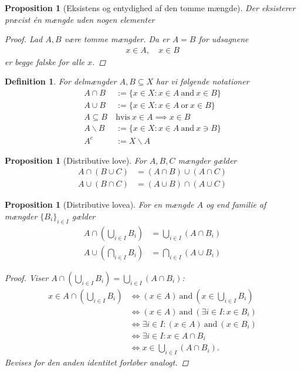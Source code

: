 \documentclass[10pt,twoside,openany,final]{memoir}
\theoremstyle{break}
\newtheorem{proposition}[section]{Proposition}
\newtheorem{definition}[section]{Definition}
\theoremstyle{Break}
\begin{document}
\begin{proposition}[Eksistens og entydighed af den tomme mængde]
Der eksisterer præcist én mængde uden nogen elementer
\begin{proof}
Lad $A,B$ være tomme mængder. Da er $A=B$ for udsagnene
\begin{align*}
x \in A, \quad x \in B
\end{align*}
er begge falske for alle $x$.
\end{proof}
\end{proposition}

\begin{definition}
For delmængder $A,B \subseteq X$ har vi følgende notationer
\begin{align*}
A \cap B &:= \{ x \in X \colon x \in A \ \text{and} \ x \in B\}\\
A \cup B &:= \{ x \in X \colon x \in A \ \text{or} \ x \in B\}\\
A \subseteq B \ &\text{hvis} \ x \in A \implies x \in B\\
A \backslash B &:= \{ x \in X \colon x \in A \ \text{and} \ x \ni B\}\\
A^c &:= X \backslash A
\end{align*}
\end{definition}

\begin{proposition}[Distributive love]
For $A,B,C$ mængder gælder
\begin{align*}
A \cap (B \cup C)&=(A \cap B) \cup (A \cap C)\\
A \cup (B \cap C)&= (A \cup B) \cap (A \cup C)
\end{align*}
\end{proposition}

\begin{proposition}[Distributive lovea]
For en mængde $A$ og end familie af mængder $\{B_{i}\}_{i \in I}$ gælder
\begin{align*}
A \cap  \left(\bigcup_{i \in I}B_{i}\right)&= \bigcup_{i \in I}(A \cap B_{i})\\
A \cup  \left(\bigcap_{i \in I}B_{i}\right)&= \bigcap_{i \in I}(A \cup B_{i})
\end{align*}
\begin{proof}
Viser $\displaystyle A \cap  \left( \bigcup_{i \in I} B_{i} \right)= \bigcup_{i \in I}(A \cap B_{i})$:
\begin{align*}
x \in A \cap  \left(\bigcup_{i \in I}B_{i}\right)& \iff (x \in A) \ \text{and} \ (x \in \bigcup_{i \in I} B_{i}) \\
&\iff (x \in A) \ \text{and} \ (\exists i \in I \colon x \in B_{i})\\
&\iff \exists i \in I \colon (x \in A) \ \text{and} \ (x \in B_{i})\\
&\iff \exists i \in I \colon x \in A \cap B_{i}\\
& \iff x \in \bigcup_{i \in I}(A \cap B_{i}).
\end{align*}
Bevises for den anden identitet forløber analogt.
\end{proof}
\end{proposition}
\end{document}
